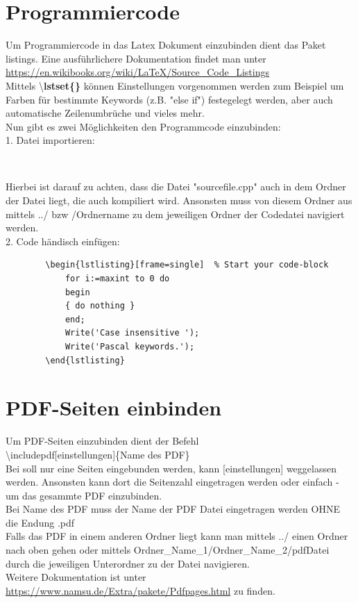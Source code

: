 	\section{Programmiercode}
	Um Programmiercode in das Latex Dokument einzubinden dient das Paket listings.
	Eine ausführlichere Dokumentation findet man unter \url{https://en.wikibooks.org/wiki/LaTeX/Source_Code_Listings}\\
	Mittels \textbackslash \textbf{lstset\{\}} können Einstellungen vorgenommen werden zum Beispiel um Farben für bestimmte Keywords (z.B. "else if") festegelegt werden, aber auch automatische Zeilenumbrüche und vieles mehr.\\
	Nun gibt es zwei Möglichkeiten den Programmcode einzubinden:\\
	1. Datei importieren:
	\begin{verbatim}
		
	\end{verbatim}
	Hierbei ist darauf zu achten, dass die Datei "sourcefile.cpp" auch in dem Ordner der Datei liegt, die auch kompiliert wird. Ansonsten muss von diesem Ordner aus mittels ../ bzw /Ordnername zu dem jeweiligen Ordner der Codedatei navigiert werden.\\
	
	2. Code händisch einfügen:
	\begin{verbatim}
		\begin{lstlisting}[frame=single]  % Start your code-block
			for i:=maxint to 0 do
			begin
			{ do nothing }
			end;
			Write('Case insensitive ');
			Write('Pascal keywords.');
		\end{lstlisting}
	\end{verbatim}
	
	
	
	
	\newpage
	\section{PDF-Seiten einbinden}
		Um PDF-Seiten einzubinden dient der Befehl\\ 
		\textbackslash includepdf[einstellungen]\{Name des PDF\}\\
		Bei soll nur eine Seiten eingebunden werden, kann [einstellungen] weggelassen werden. Ansonsten kann dort die Seitenzahl eingetragen werden oder einfach - um das gesammte PDF einzubinden.\\
		Bei Name des PDF muss der Name der PDF Datei eingetragen werden OHNE die Endung .pdf\\
		Falls das PDF in einem anderen Ordner liegt kann man mittels ../ einen Ordner nach oben gehen oder mittels Ordner_Name_1/Ordner_Name_2/pdfDatei durch die jeweiligen Unterordner zu der Datei navigieren.\\
		Weitere Dokumentation ist unter \url{https://www.namsu.de/Extra/pakete/Pdfpages.html} zu finden.
			
